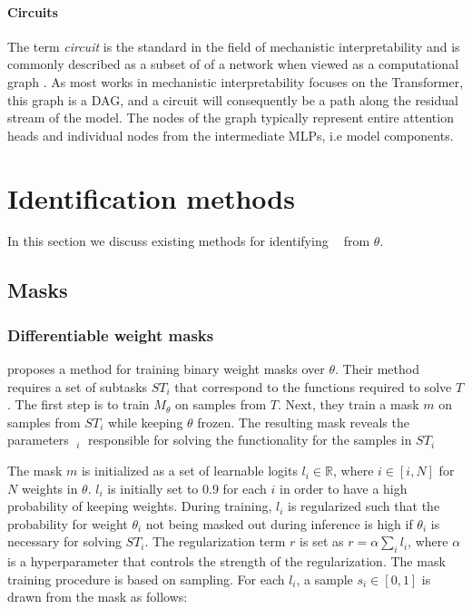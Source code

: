 \documentclass[11pt]{article}
\DeclareMathOperator*{\subnetwork}{\hat{\theta}}
\begin{document}
\paragraph{Circuits}
The term \textit{circuit} is the standard in the field of mechanistic interpretability and is commonly described as a subset of of a network when viewed as a computational graph \citep{conmy2023towards, nanda2023progress, wang2023interpretability}. As most works in mechanistic interpretability focuses on the Transformer, this graph is a DAG, and a circuit will consequently be a path along the residual stream of the model. The nodes of the graph typically represent entire attention heads and individual nodes from the intermediate MLPs, i.e model components.

\section{Identification methods}
In this section we discuss existing methods for identifying $\subnetwork$ from $\theta$.
\subsection{Masks}
\subsubsection{Differentiable weight masks}
\citet{csordas2020neural} proposes a method for training binary weight masks over $\theta$. Their method requires a set of subtasks $ST_i$ that correspond to the functions required to solve $T$. The first step is to train $M_\theta$ on samples from $T$.  Next, they train a mask $m$ on samples from $ST_i$ while keeping $\theta$ frozen. The resulting mask reveals the parameters $\subnetwork_i$ responsible for solving the functionality for the samples in $ST_i$

The mask $m$ is initialized as a set of learnable logits $l_i \in \mathbb{R}$, where $i \in [i, N]$ for $N$ weights in $\theta$. $l_i$ is initially set to $0.9$ for each $i$ in order to have a high probability of keeping weights. During training, $l_i$ is regularized such that the probability for weight $\theta_i$ not being masked out during inference is high if $\theta_i$ is necessary for solving $ST_i$. The regularization term $r$ is set as $r = \alpha \sum_i l_i$, where $\alpha$ is a hyperparameter that controls the strength of the regularization. The mask training procedure is based on sampling. For each $l_i$, a sample $s_i \in [0, 1]$ is drawn from the mask as follows:
\end{document}
